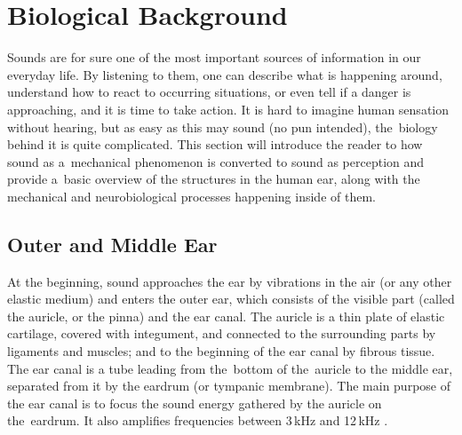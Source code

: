 \section{Biological Background}\label{chapter:biology}

Sounds are for sure one of the most important sources of information in our everyday life. By listening to them, one can describe what is happening around, understand how to react to occurring situations, or even tell if a danger is approaching, and it is time to take action. It is hard to imagine human sensation without hearing, but as easy as this may sound (no pun intended), the~biology behind it is quite complicated. This section will introduce the reader to how sound as a~mechanical phenomenon is converted to sound as perception and provide a~basic overview of the structures in the human ear, along with the mechanical and neurobiological processes happening inside of them.

\subsection{Outer and Middle Ear}

At the beginning, sound approaches the ear by vibrations in the air (or any other elastic medium) and enters the outer ear, which consists of the visible part (called the auricle, or the pinna) and the ear canal. The auricle is a thin plate of elastic cartilage, covered with integument, and connected to the surrounding parts by ligaments and muscles; and to the beginning of the ear canal by fibrous tissue. The ear canal is a tube leading from the~bottom of the~auricle to the middle ear, separated from it by the eardrum (or tympanic membrane). The main purpose of the ear canal is to focus the sound energy gathered by the auricle on the~eardrum. It also amplifies frequencies between 3\,kHz and 12\,kHz \cite{Standring2008}.\\

